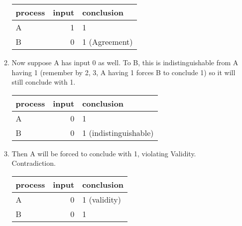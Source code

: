 \documentclass[11pt]{article}
\begin{document}
\begin{enumerate}
\begin{enumerate}
\begin{center}
                  \begin{tabular}{lrl}
                    process & input & conclusion\\
                    \hline
                    A & 1 & 1\\
                    B & 0 & 1 (Agreement)\\
                  \end{tabular}
                \end{center}
          \item Now suppose A has input 0 as well. To B, this is indistinguishable from A
                having 1 (remember by 2, 3, A having 1 forces B to conclude 1) so it will
                still conclude with 1.
                \begin{center}
                  \begin{tabular}{lrl}
                    process & input & conclusion\\
                    \hline
                    A & 0 & 1\\
                    B & 0 & 1 (indistinguishable)\\
                  \end{tabular}
                \end{center}
          \item Then A will be forced to conclude with 1, violating Validity. Contradiction.
                \begin{center}
                  \begin{tabular}{lrl}
                    process & input & conclusion\\
                    \hline
                    A & 0 & 1 (validity)\\
                    B & 0 & 1\\
                  \end{tabular}
                \end{center}
        \end{enumerate}
\end{enumerate}
\end{document}
